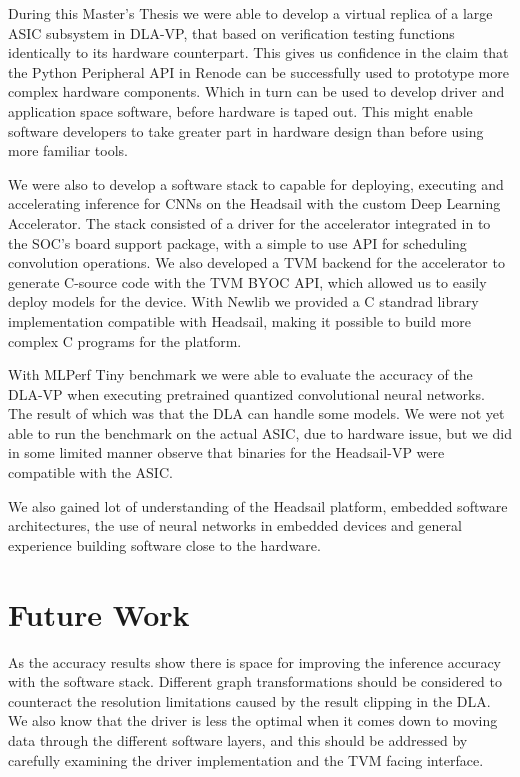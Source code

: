 \documentclass[12pt,a4paper,english
]{tunithesis}
\begin{document}
During this Master's Thesis we were able to develop a virtual replica of a large ASIC subsystem in DLA-VP, that based on verification testing functions identically to its hardware counterpart. This gives us confidence in the claim that the Python Peripheral API in Renode can be successfully used to prototype more complex hardware components. Which in turn can be used to develop driver and application space software, before hardware is taped out.
This might enable software developers to take greater part in hardware design than before using more familiar tools.

We were also to develop a software stack to capable for deploying, executing and accelerating inference for CNNs on the Headsail with the custom Deep Learning Accelerator.
The stack consisted of a driver for the accelerator integrated in to the SOC's board support package, with a simple to use API for scheduling convolution operations.
We also developed a TVM backend for the accelerator to generate C-source code with the TVM BYOC API, which allowed us to easily deploy models for the device.
With Newlib we provided a C standrad library implementation compatible with Headsail, making it possible to build more complex C programs for the platform.

With MLPerf Tiny benchmark we were able to evaluate the accuracy of the DLA-VP when executing pretrained quantized convolutional neural networks. The result of which was that the DLA can handle some models. We were not yet able to run the benchmark on the actual ASIC, due to hardware issue, but we did in some limited manner observe that binaries for the Headsail-VP were compatible with the ASIC.

We also gained lot of understanding of the Headsail platform, embedded software architectures, the use of neural networks in embedded devices and general experience building software close to the hardware.

\section{Future Work}
As the accuracy results show there is space for improving the inference accuracy with the software stack. Different graph transformations should be considered to counteract the resolution limitations caused by the result clipping in the DLA. We also know that the driver is less the optimal when it comes down to moving data through the different software layers, and this should be addressed by carefully examining the driver implementation and the TVM facing interface.
\end{document}
